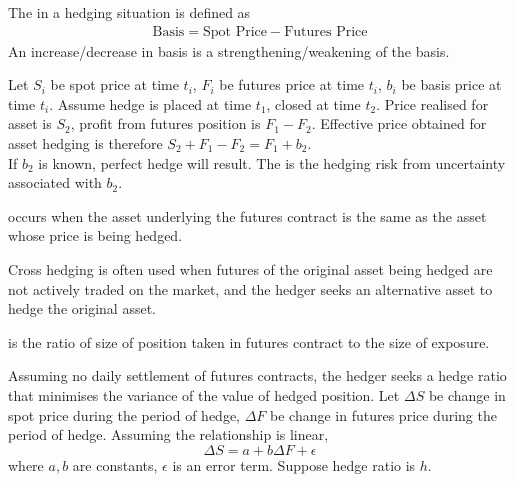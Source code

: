 \begin{definition}
The  in a hedging situation is defined as
\begin{align}
\text{Basis} = \text{Spot Price} - \text{Futures Price} \nonumber
\end{align}
An increase/decrease in basis is a strengthening/weakening of the basis.
\end{definition}

\begin{definition}
Let $S_i$ be spot price at time $t_i$, $F_i$ be futures price at time $t_i$, $b_i$ be basis price at time $t_i$.	 Assume hedge is placed at time $t_1$, closed at time $t_2$. Price realised for asset is $S_2$, profit from futures position is $F_1 - F_2$.  Effective price obtained for asset hedging is therefore $S_2 + F_1 - F_2 = F_1 + b_2$.\\
If $b_2$ is known, perfect hedge will result. The  is the hedging risk from uncertainty associated with $b_2$.
\end{definition}

\begin{definition}
 occurs when the asset underlying the futures contract is the same as the asset whose price is being hedged.
\end{definition}

Cross hedging is often used when futures of the original asset being hedged are not actively traded on the market, and the hedger seeks an alternative asset to hedge the original asset.

\begin{definition}
 is the ratio of size of position taken in futures contract to the size of exposure.
\end{definition}

Assuming no daily settlement of futures contracts, the hedger seeks a hedge ratio that minimises the variance of the value of hedged position. Let $\Delta S$ be change in spot price during the period of hedge, $\Delta F$ be change in futures price during the period of hedge. Assuming the relationship is linear,
\begin{equation}
\Delta S = a + b \Delta F + \epsilon	 \nonumber
\end{equation}
where $a,b$ are constants, $\epsilon$ is an error term. Suppose hedge ratio is $h$.